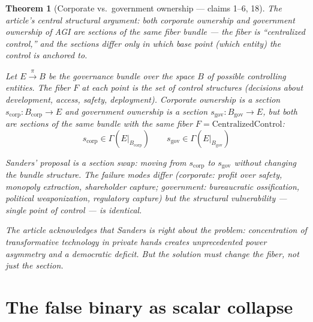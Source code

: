 \documentclass[11pt,a4paper]{article}
\newtheorem{theorem}[definition]{Theorem}
\begin{document}
\begin{theorem}[Corporate vs.\ government ownership --- claims 1--6, 18]
\label{thm:section-swap}
The article's central structural argument: both corporate ownership and
government ownership of AGI are \emph{sections of the same fiber bundle}
--- the fiber is ``centralized control,'' and the sections differ only
in which base point (which entity) the control is anchored to.

Let $E \xrightarrow{\pi} B$ be the governance bundle over the space
$B$ of possible controlling entities. The fiber $F$ at each point is
the set of control structures (decisions about development, access,
safety, deployment). Corporate ownership is a section
$s_{\text{corp}}: B_{\text{corp}} \to E$ and government ownership is
a section $s_{\text{gov}}: B_{\text{gov}} \to E$, but both are
sections of the \emph{same bundle} with the \emph{same fiber}
$F = \text{CentralizedControl}$:
\[
  s_{\text{corp}} \in \Gamma(E|_{B_{\text{corp}}}) \qquad
  s_{\text{gov}} \in \Gamma(E|_{B_{\text{gov}}})
\]

Sanders' proposal is a \emph{section swap}: moving from $s_{\text{corp}}$
to $s_{\text{gov}}$ without changing the bundle structure. The failure
modes differ (corporate: profit over safety, monopoly extraction,
shareholder capture; government: bureaucratic ossification, political
weaponization, regulatory capture) but the structural vulnerability
--- single point of control --- is identical.

The article acknowledges that Sanders is right about the problem:
concentration of transformative technology in private hands creates
unprecedented power asymmetry and a democratic deficit. But the solution
must change the \emph{fiber}, not just the \emph{section}.
\end{theorem}


\section{The false binary as scalar collapse}
\label{sec:scalar}
\end{document}
